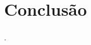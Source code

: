 \documentclass[
	12pt,				%
	oneside,			%
	a4paper,			%
	english,			%
	brazil				%
]{abntex2}
\begin{document}
	


\chapter{Conclusão}
	\lipsum[1-1]
	
	\cite{aruvali2014objectmemory}
	\cite{toro2015intelligentsystems}
	\cite{vaidya2018industryfour}
	\cite{souit2013soa}
	.














\postextual

\end{document}
